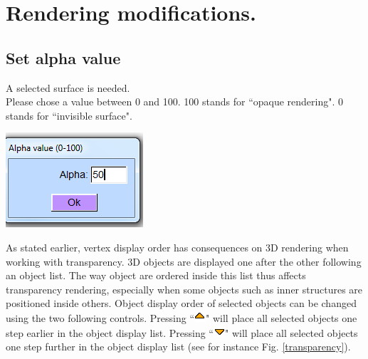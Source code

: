 \section{Rendering modifications.}
\subsection{Set alpha value}
\noindent
\begin{minipage}{0.5\textwidth}

A selected surface is needed.\\
Please chose a value between 0 and 100. 100 stands for ``opaque
rendering". 0 stands for ``invisible surface".\\


\end{minipage}    
\begin{minipage}{0.5\textwidth}\centering
  \includegraphics[scale=0.5]{images/Edit_selected_objects/10_transparency.png}
 \end{minipage} 
\noindent




As stated earlier, vertex display order has consequences on 3D rendering when working with
transparency. 3D objects are displayed one after the other following an object list. The way object are ordered inside this list thus affects transparency rendering, especially when some objects such as inner structures are positioned inside others. Object display order of selected objects can be changed using the two following controls. Pressing ``\includegraphics[scale=0.7]{images/pixmap/s_dessous_17.png}" will place all selected objects one step earlier in the object display list. Pressing ``\includegraphics[scale=0.7]{images/pixmap/s_dessus_17.png}" will place all selected objects one step further in the object display
list (see for instance Fig. \ref{transparency}). \\

